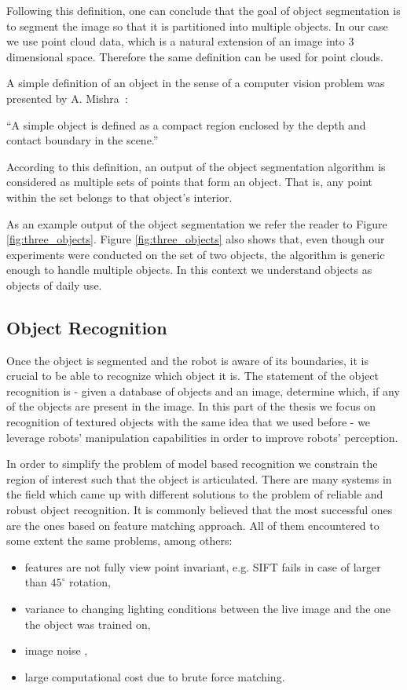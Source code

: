  Following this definition, one can conclude that the goal of object segmentation is to segment the image so that it is partitioned into multiple objects. In our case we use point cloud data, which is a natural extension of an image into 3 dimensional space. Therefore the same definition can be used for point clouds. 

A simple definition of an object in the sense of a computer vision problem was presented by A. Mishra~\cite{mishra2012segmenting}:

\noindent ``A simple object is defined as a compact region enclosed by the depth and
contact boundary in the scene.''

According to this definition, an output of the object segmentation algorithm is considered as multiple sets of points that form an object. That is, any point within the set belongs to that object's interior. 

As an example output of the object segmentation we refer the reader to Figure \ref{fig:three_objects}. Figure \ref{fig:three_objects} also shows that, even though our experiments were conducted on the set of two objects, the algorithm is generic enough to handle multiple objects. In this context we understand objects as objects of daily use.


\subsection{Object Recognition}

Once the object is segmented and the robot is aware of its boundaries, it is crucial to be able to recognize which object it is. The statement of the object recognition is -  
given a database of objects and an image, determine which, if any of the objects are present in the image. In this part of the thesis we focus on recognition of textured objects with the same idea that we used before - we leverage robots' manipulation capabilities in order to improve robots' perception.

In order to simplify the problem of model based recognition we constrain the region of interest such that the object is articulated. There are many systems in the field which came up with different solutions to the problem of reliable and robust object recognition. It is commonly believed that the most successful ones are the ones based on feature matching approach. All of them encountered to some extent the same problems, among others:

\begin{itemize}
\item features are not fully view point invariant, e.g. SIFT fails in case of larger than
$45^\circ$ rotation,
\item  variance to changing lighting conditions between the live
image and the one the object was trained on,
\item image noise ,
\item large computational cost due to brute force matching.
\end{itemize}

